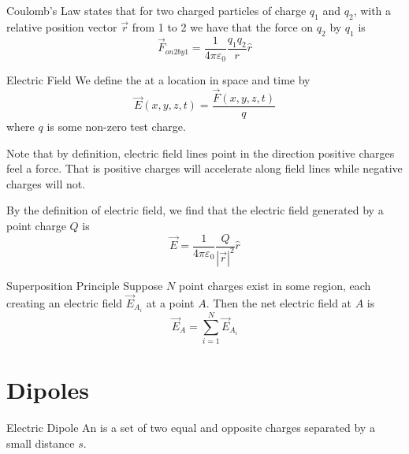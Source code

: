 \documentclass[12pt]{report}
\begin{document}
\begin{defn}{Coulomb's Law}{}
         states that for two charged particles of charge $q_1$ and $q_2$, with a relative position vector $\vec{r}$ from 1 to 2 we have that the force on $q_2$ by $q_1$ is \begin{equation}
                \vec{F}_{on2by1} = \frac{1}{4\pi\varepsilon_0}\frac{q_1q_2}{r}\hat{r}
        \end{equation}
\end{defn}


\begin{defn}{Electric Field}{}
        We define the  at a location in space and time by \begin{equation}
                \vec{E}(x,y,z,t) = \frac{\vec{F}(x,y,z,t)}{q}
        \end{equation}
        where $q$ is some non-zero test charge.
\end{defn}


\begin{rmk}{}{}
        Note that by definition, electric field lines point in the direction positive charges feel a force. That is positive charges will accelerate along field lines while negative charges will not.
\end{rmk}


\begin{cor}{}{}
        By the definition of electric field, we find that the electric field generated by a point charge $Q$ is \begin{equation}
                \vec{E} = \frac{1}{4\pi\varepsilon_0}\frac{Q}{|\vec{r}|^2}\hat{r}
        \end{equation}
\end{cor}


\begin{cor}{Superposition Principle}{}
        Suppose $N$ point charges exist in some region, each creating an electric field $\vec{E}_{A_i}$ at a point $A$. Then the net electric field at $A$ is \begin{equation}
                \vec{E}_A = \sum_{i=1}^N\vec{E}_{A_i}
        \end{equation}
\end{cor}

\section{Dipoles}

\begin{defn}{Electric Dipole}{}
        An  is a set of two equal and opposite charges separated by a small distance $s$.
\end{defn}
\end{document}
